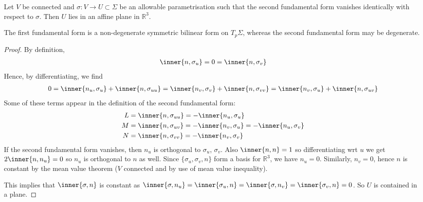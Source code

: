 \begin{lemma} \label{lem:2.5}
	Let $V$ be connected and $\sigma \colon V \to U \subset \Sigma$ be an allowable parametrisation such that the second fundamental form vanishes identically with respect to $\sigma$.
	Then $U$ lies in an affine plane in $\mathbb{R}^3$.
\end{lemma}

\begin{remark}
	The first fundamental form is a non-degenerate symmetric bilinear form on $T_p \Sigma$, whereas the second fundamental form may be degenerate.
\end{remark}

\begin{proof}
	By definition,
	\begin{align*}
		\inner{n,\sigma_u} = 0 = \inner{n,\sigma_v}
	\end{align*}
	Hence, by differentiating, we find
	\begin{align*}
		0 = \inner{n_u, \sigma_u} + \inner{n, \sigma_{uu}} = \inner{n_v, \sigma_v} + \inner{n, \sigma_{vv}} = \inner{n_v, \sigma_u} + \inner{n,\sigma_{uv}}
	\end{align*}
	Some of these terms appear in the definition of the second fundamental form:
	\begin{align*}
		L &= \inner{n,\sigma_{uu}} = -\inner{n_u, \sigma_u} \\
		M &= \inner{n,\sigma_{uv}} = -\inner{n_v, \sigma_u} = -\inner{n_u, \sigma_v} \\
		N &= \inner{n,\sigma_{vv}} = -\inner{n_v, \sigma_v}
	\end{align*}
	If the second fundamental form vanishes, then $n_u$ is orthogonal to $\sigma_u$, $\sigma_v$.
	Also $\inner{n, n} = 1$ so differentiating wrt $u$ we get $2\inner{n, n_u} = 0$ so $n_u$ is orthogonal to $n$ as well.
	Since $\{\sigma_u, \sigma_v, n\}$ form a basis for $\mathbb R^3$, we have $n_u = 0$.
	Similarly, $n_v = 0$, hence $n$ is constant by the mean value theorem ($V$ connected and by use of mean value inequality).

	This implies that $\inner{\sigma, n}$ is constant as $\inner{\sigma, n_u} = \inner{\sigma_u, n} = \inner{\sigma, n_v} = \inner{\sigma_v, n} = 0$.
	So $U$ is contained in a plane.
\end{proof}

